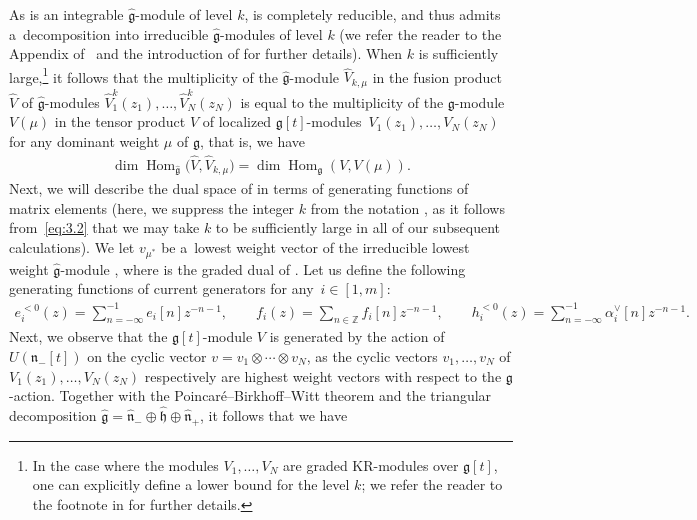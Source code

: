 \documentclass[pdftex]{sigma}
\numberwithin{equation}{section}
\DeclareMathOperator{\Hom}{Hom}
\begin{document}
As  is an integrable $\widehat{\mathfrak{g}}$-module of level $k$,  is completely reducible, and thus  admits a~decomposition into irreducible $\widehat{\mathfrak{g}}$-modules of level $k$ (we refer the reader to the Appendix of~\cite{FKLMM01} and the introduction of \cite{FJKLM04} for further details). When $k$ is sufficiently large,\footnote{In the case where the modules $V_1,\dots,V_N$ are graded KR-modules over $\mathfrak{g}[t]$, one can explicitly define a lower bound for the level $k$; we refer the reader to the footnote in \cite[Section 5.1]{AK07} for further details.} it follows that the multiplicity of the $\widehat{\mathfrak{g}}$-module $\widehat{V}_{k,\mu}$ in the fusion product $\widehat{V}$ of $\widehat{\mathfrak{g}}$-modules $\widehat{V}_1^k(z_1),\dots,\widehat{V}_N^k(z_N)$ is equal to the multiplicity of the $\mathfrak{g}$-module $V({\mu})$ in the tensor product $V$ of localized $\mathfrak{g}[t]$-modules~${V_1(z_1),\dots,V_N(z_N)}$ for any dominant weight $\mu$ of $\mathfrak{g}$, that is, we have \cite[equation~(3.6)]{AK07}
\begin{gather}\label{eq:3.2}
\dim\Hom_{\widehat{\mathfrak{g}}}\bigl(\widehat{V},\widehat{V}_{k,\mu}\bigr)=\dim\Hom_{\mathfrak{g}}(V, V(\mu)).
\end{gather}
Next, we will describe the dual space  of \smash{$\Hom_{\widehat{\mathfrak{g}}} \bigl(\widehat{V},\widehat{V}_{k,\mu}\bigr)$} in terms of generating functions of matrix elements (here, we suppress the integer $k$ from the notation , as it follows from~\eqref{eq:3.2} that we may take $k$ to be sufficiently large in all of our subsequent calculations). We let $v_{\mu^*}$ be a~lowest weight vector of the irreducible lowest weight $\widehat{\mathfrak{g}}$-module , where  is the graded dual of . Let us define the following generating functions of current generators for any~${i\in[1,m]}$:
\begin{gather*}
e_i^{<0}(z)=\sum_{n=-\infty}^{-1}e_i[n]z^{-n-1},\qquad
f_i(z)=\sum_{n\in\mathbb{Z}}f_i[n]z^{-n-1},\qquad
h_i^{<0}(z)=\sum_{n=-\infty}^{-1}\alpha_i^{\vee}[n]z^{-n-1}.
\end{gather*}
Next, we observe that the $\mathfrak{g}[t]$-module $V$ is generated by the action of $U(\mathfrak{n}_-[t])$ on the cyclic vector $v=v_1 \otimes\cdots\otimes v_N$, as the cyclic vectors $v_1,\dots,v_N$ of $V_1(z_1),\dots,V_N(z_N)$ respectively are highest weight vectors with respect to the $\mathfrak{g}$-action. Together with the Poincar\'e--Birkhoff--Witt theorem and the triangular decomposition $\widehat{\mathfrak{g}}= \widehat{\mathfrak{n}}_-\oplus\widehat{\mathfrak{h}}\oplus \widehat{\mathfrak{n}}_+$, it follows that we have
\end{document}
